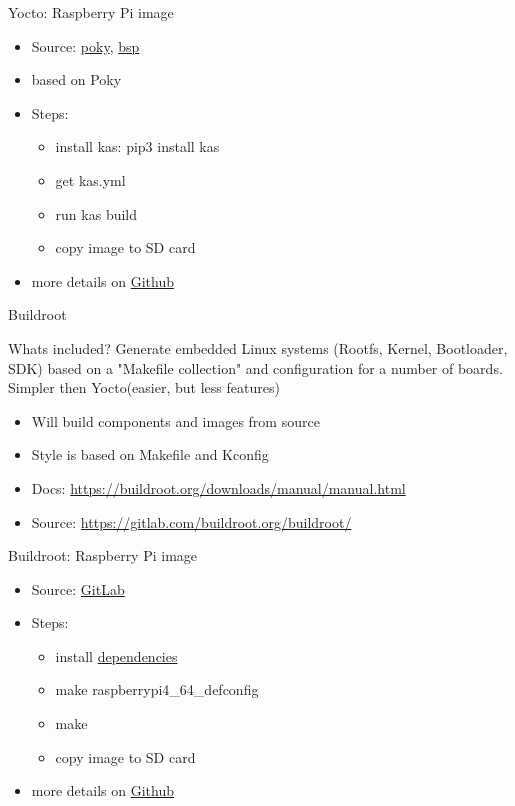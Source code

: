 \documentclass{beamer}
\begin{document}
\begin{frame}{Yocto: Raspberry Pi image}
	\begin{itemize}
		\item Source: \href{https://git.yoctoproject.org/poky}{poky}, \href{https://git.yoctoproject.org/meta-raspberrypi/}{bsp}
		\item based on Poky
		\item Steps:
		\begin{itemize}
			\item install kas: pip3 install kas
			\item get kas.yml
			\item run kas build
			\item copy image to SD card
		\end{itemize}
		\item more details on \href{https://github.com/tomirgang/eh21_maintainable_linux/tree/main/examples/first_build_rpi4/yocto}{Github}
	\end{itemize}
\end{frame}

\begin{frame}{Buildroot}
	\begin{block}{Whats included?}
		Generate embedded Linux systems (Rootfs, Kernel, Bootloader, SDK)  based on a "Makefile collection" and configuration for a number of boards. Simpler then Yocto(easier, but less features)
	\end{block}

	\begin{itemize}
		\item Will build components and images from source
		\item Style is based on Makefile and Kconfig 
		\item Docs: \url{https://buildroot.org/downloads/manual/manual.html}
		\item Source: \url{https://gitlab.com/buildroot.org/buildroot/}
	\end{itemize}
\end{frame}

\begin{frame}{Buildroot: Raspberry Pi image}
	\begin{itemize}
		\item Source: \href{https://gitlab.com/buildroot.org/buildroot/}{GitLab}
		\item Steps:
		\begin{itemize}
			\item install \href{https://buildroot.org/downloads/manual/manual.html\#requirement}{dependencies}
			\item make raspberrypi4\_64\_defconfig
			\item make
			\item copy image to SD card
		\end{itemize}
		\item more details on \href{https://github.com/tomirgang/eh21_maintainable_linux/tree/main/examples/first_build_rpi4/buildroot}{Github}
	\end{itemize}
\end{frame}
\end{document}
